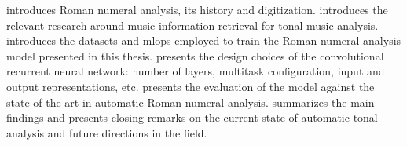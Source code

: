 
introduces Roman numeral analysis, its history and
digitization.  introduces the relevant
research around music information retrieval for tonal music
analysis.  introduces
the datasets and \gls{mlops} employed to train the Roman
numeral analysis model presented in this thesis.
 presents the design choices of the
convolutional recurrent neural network: number of layers,
multitask configuration, input and output representations,
etc.  presents the
evaluation of the model against the state-of-the-art in
automatic Roman numeral analysis. 
summarizes the main findings and presents closing remarks on
the current state of automatic tonal analysis and future
directions in the field.
